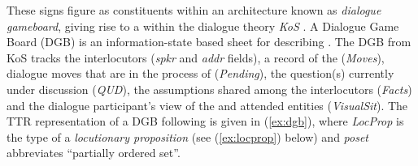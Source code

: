 \documentclass[output=paper,biblatex,babelshorthands,newtxmath,draftmode,colorlinks,citecolor=brown]{langscibook}
\begin{document}
\largerpage[2]
These \HPSGTTR signs figure as constituents within an architecture known as \emph{dialogue gameboard}, giving rise to a  within the dialogue theory \emph{KoS}
\citep{Ginzburg:1994,Ginzburg:1996,Ginzburg:2003,Ginzburg:2012}. 
%
A Dialogue Game Board (DGB) is an information-state based sheet for describing .
%
The DGB from KoS tracks the interlocutors (\textit{spkr} and \textit{addr} fields), a record of the  (\textit{Moves}), dialogue moves that are in the process of  (\textit{Pending}), the question(s) currently under discussion (\textit{QUD}), the assumptions shared among the interlocutors (\textit{Facts}) and   the dialogue
participant's view of 
the  and attended entities (\textit{VisualSit}).
%
The TTR representation of a DGB following \citet{Ginzburg:2012} is given in (\ref{ex:dgb}), where \textit{LocProp} is the type of a \emph{locutionary proposition} (see (\ref{ex:locprop}) below) and \textit{poset} abbreviates \enquote{partially ordered set}.
%
\ea \label{ex:dgb}
\z
\end{document}
